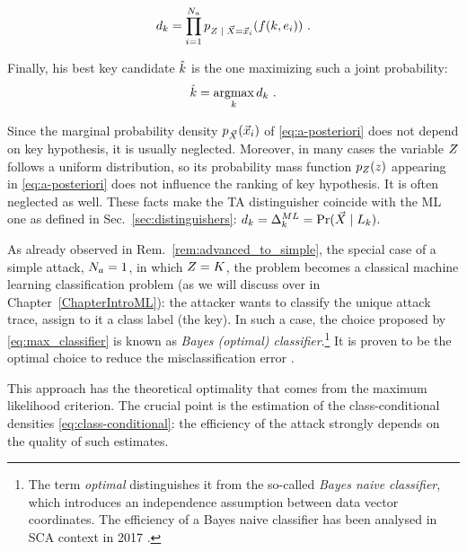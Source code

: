 \begin{equation}\label{eq:joint_distr}
d_{\keyVar} = \prod_{i=1}^{\nbAttackTraces} \pdf_{\given{\sensRandVar}{\vaLeakVec = \vLeakVec_i}}(\sensFunction(\keyVar,\publicParVar_i) ) \mbox{ .}
\end{equation}

Finally, his best key candidate $\hat{k}$ is the one maximizing such a joint probability:
\begin{equation}\label{eq:max_classifier}
\hat{k} = \operatorname*{argmax}_{k} d_{k} \mbox{ .}
\end{equation}

\begin{remark}Since the marginal probability density $p_{\vec{X}}(\vec{x}_i)$ of \eqref{eq:a-posteriori} does not depend on key hypothesis, it is usually neglected. Moreover, in many cases the variable $Z$ follows a uniform distribution, so its probability mass function $p_{Z}(z)$ appearing in \eqref{eq:a-posteriori}  does not influence the ranking of key hypothesis. It is often neglected as well. These facts make the TA distinguisher coincide with the ML one as defined in Sec.~\ref{sec:distinguishers}: $d_{\keyVar} = \distinguisher^{ML}_{\keyVar} = \prob(\given{\vaLeakVec}{\leakageModel_\keyVar})$.
\end{remark}

\begin{remark}
As already observed in Rem.~\ref{rem:advanced_to_simple}, the special case of a simple attack, \ie $N_a = 1$, in which $Z = K$, the problem becomes a classical machine learning classification problem (as we will discuss over in Chapter~\ref{ChapterIntroML}): the attacker wants to classify the unique attack trace, \ie assign to it a class label (the key). In such a case, the choice proposed by \eqref{eq:max_classifier} is known as \emph{Bayes (optimal) classifier}.\footnote{The term \emph{optimal} distinguishes it from the so-called \emph{Bayes naive classifier}, which introduces an independence assumption between data vector coordinates. The efficiency of a Bayes naive classifier has been analysed in SCA context in 2017 \cite{picek2017template}.} It is proven to be the optimal choice to reduce the misclassification error \cite{christopher2006pattern}.
\end{remark}

This approach has the theoretical optimality that comes from the maximum likelihood criterion. The crucial point is the estimation of the class-conditional densities \eqref{eq:class-conditional}: the efficiency of the attack strongly depends on the quality of such estimates. 

